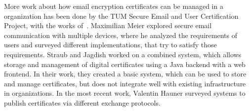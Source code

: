 More work about how email encryption certificates can be managed in a organization has been done by the TUM Secure
Email and User Certification Project, with the works
of~\citet{hauner2016interoperability, jagdish2016certservice, straub2016directoryservice, maier2015multidevice}.
Maximilian Meier explored secure email communication with multiple devices, where he analyzed the requirements of
users and surveyed different implementations, that try to satisfy those requirements.
Straub and Jagdish worked on a combined system, which allows storage and management of digital certificates using a Java
backend with a web frontend.
In their work, they created a basic system, which can be used to store and manage certificates, but does not integrate
well with existing infrastructure in organizations.
In the most recent work, Valentin Hauner surveyed systems to publish certificates via different exchange protocols.
